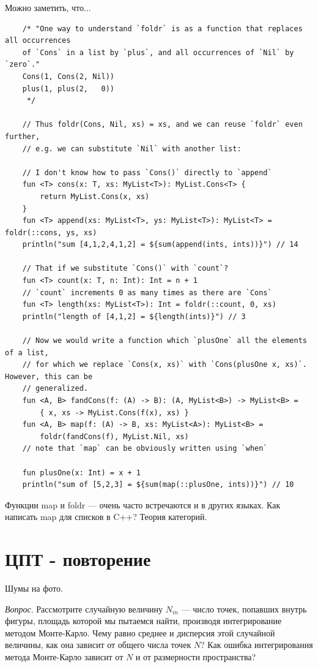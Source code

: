 \documentclass{book}
\begin{document}
Можно заметить, что...
\begin{verbatim}
    /* "One way to understand `foldr` is as a function that replaces all occurrences
    of `Cons` in a list by `plus`, and all occurrences of `Nil` by `zero`."
    Cons(1, Cons(2, Nil))
    plus(1, plus(2,   0))
     */

    // Thus foldr(Cons, Nil, xs) = xs, and we can reuse `foldr` even further,
    // e.g. we can substitute `Nil` with another list:

    // I don't know how to pass `Cons()` directly to `append`
    fun <T> cons(x: T, xs: MyList<T>): MyList.Cons<T> {
        return MyList.Cons(x, xs)
    }
    fun <T> append(xs: MyList<T>, ys: MyList<T>): MyList<T> = foldr(::cons, ys, xs)
    println("sum [4,1,2,4,1,2] = ${sum(append(ints, ints))}") // 14

    // That if we substitute `Cons()` with `count`?
    fun <T> count(x: T, n: Int): Int = n + 1
    // `count` increments 0 as many times as there are `Cons`
    fun <T> length(xs: MyList<T>): Int = foldr(::count, 0, xs)
    println("length of [4,1,2] = ${length(ints)}") // 3

    // Now we would write a function which `plusOne` all the elements of a list,
    // for which we replace `Cons(x, xs)` with `Cons(plusOne x, xs)`. However, this can be
    // generalized.
    fun <A, B> fandCons(f: (A) -> B): (A, MyList<B>) -> MyList<B> =
        { x, xs -> MyList.Cons(f(x), xs) }
    fun <A, B> map(f: (A) -> B, xs: MyList<A>): MyList<B> =
        foldr(fandCons(f), MyList.Nil, xs)
    // note that `map` can be obviously written using `when`

    fun plusOne(x: Int) = x + 1
    println("sum of [5,2,3] = ${sum(map(::plusOne, ints))}") // 10
\end{verbatim}

Функции map и foldr --- очень часто встречаются и в других языках. Как написать map для списков в
C++? Теория категорий.

\section{ЦПТ - повторение}

Шумы на фото.

\textit{Вопрос}. Рассмотрите случайную величину $N_{in}$ --- число точек, попавших внутрь фигуры,
площадь которой мы пытаемся найти, производя интегрирование методом Монте-Карло. Чему равно среднее
и дисперсия этой случайной величины, как она зависит от общего числа точек $N$? Как ошибка
интегрирования метода Монте-Карло зависит от $N$ и от размерности пространства?
\end{document}
